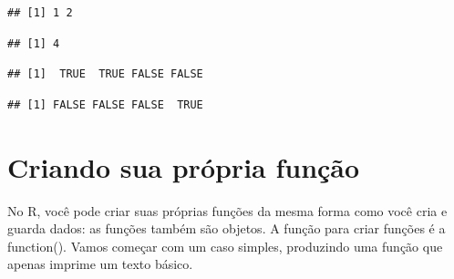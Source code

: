 \documentclass[
]{book}
\newenvironment{Shaded}{\begin{snugshade}}{\end{snugshade}}
\newcommand{\KeywordTok}[1]{\textcolor[rgb]{0.13,0.29,0.53}{\textbf{#1}}}
\newcommand{\NormalTok}[1]{#1}
\newcommand{\OperatorTok}[1]{\textcolor[rgb]{0.81,0.36,0.00}{\textbf{#1}}}
\newcommand{\StringTok}[1]{\textcolor[rgb]{0.31,0.60,0.02}{#1}}
\begin{document}
\begin{Shaded}
\end{Shaded}

\begin{verbatim}
## [1] 1 2
\end{verbatim}

\begin{Shaded}
\end{Shaded}

\begin{verbatim}
## [1] 4
\end{verbatim}

\begin{Shaded}
\end{Shaded}

\begin{verbatim}
## [1]  TRUE  TRUE FALSE FALSE
\end{verbatim}

\begin{Shaded}
\end{Shaded}

\begin{verbatim}
## [1] FALSE FALSE FALSE  TRUE
\end{verbatim}

\hypertarget{criando-sua-pruxf3pria-funuxe7uxe3o}{%
\chapter{Criando sua própria função}\label{criando-sua-pruxf3pria-funuxe7uxe3o}}

No R, você pode criar suas próprias funções da mesma forma como você cria e guarda dados: as funções também são objetos. A função para criar funções é a function(). Vamos começar com um caso simples, produzindo uma função que apenas imprime um texto básico.
\end{document}
